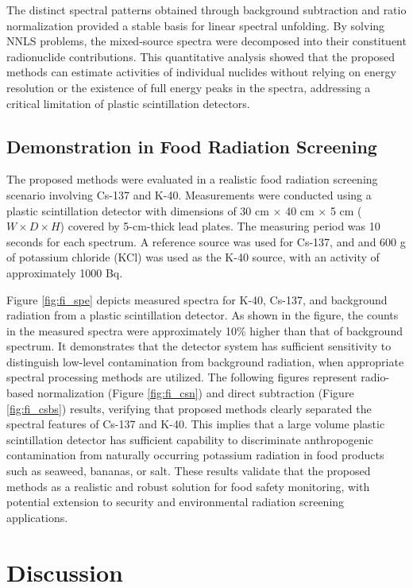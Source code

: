 \documentclass[10pt]{wlscirep}
\begin{document}
The distinct spectral patterns obtained through background subtraction and ratio normalization provided a stable basis for linear spectral unfolding. By solving NNLS problems, the mixed-source spectra were decomposed into their constituent radionuclide contributions. This quantitative analysis showed that the proposed methods can estimate activities of individual nuclides without relying on energy resolution or the existence of full energy peaks in the spectra, addressing a critical limitation of plastic scintillation detectors.

\subsection*{Demonstration in Food Radiation Screening}

The proposed methods were evaluated in a realistic food radiation screening scenario involving Cs-137 and K-40. Measurements were conducted using a plastic scintillation detector with dimensions of 30 cm $\times$ 40 cm $\times$ 5 cm ($W \times D \times H$) covered by 5-cm-thick lead plates. The measuring period was 10 seconds for each spectrum. A reference source was used for Cs-137, and and 600 g of potassium chloride (KCl) was used as the K-40 source, with an activity of approximately 1000 Bq.

Figure \ref{fig:fi_spe} depicts measured spectra for K-40, Cs-137, and background radiation from a plastic scintillation detector. As shown in the figure, the counts in the measured spectra were approximately 10\% higher than that of background spectrum. It demonstrates that the detector system has sufficient sensitivity to distinguish low-level contamination from background radiation, when appropriate spectral processing methods are utilized. The following figures represent radio-based normalization (Figure \ref{fig:fi_csn}) and direct subtraction (Figure \ref{fig:fi_csbs}) results, verifying that proposed methods clearly separated the spectral features of Cs-137 and K-40. This implies that a large volume plastic scintillation detector has sufficient capability to discriminate anthropogenic contamination from naturally occurring potassium radiation in food products such as seaweed, bananas, or salt. These results validate that the proposed methods as a realistic and robust solution for food safety monitoring, with potential extension to security and environmental radiation screening applications.

\section*{Discussion}
\end{document}
